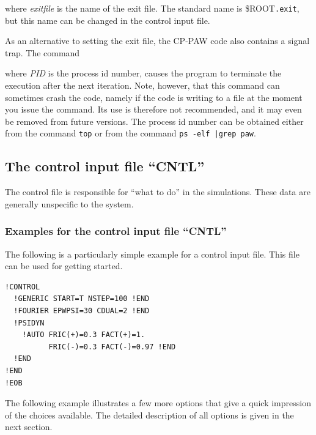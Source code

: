 \documentclass[final,12pt]{article}
\begin{document}
\bigskip{}\bigskip

\noindent where {\it exitfile} is the name of the exit file. 
The standard name is \$ROOT{\tt .exit}, but this name can be changed
in the control input file.

As an alternative to setting the exit file, the CP-PAW code also contains
a signal trap. The command

\bigskip{}\bigskip

\noindent where {\it PID} is the process id number, causes the program
to terminate the execution after the next iteration. Note, however,
that this command can sometimes crash the code, namely if the code is
writing to a file at the moment you issue the command.  Its use is
therefore not recommended, and it may even be removed from future
versions. The process id number can be obtained either from the
command \verb|top| or from the command \verb+ps -elf |grep paw+.

%
\subsection{The control input file ``CNTL''}

The control file is responsible for ``what to do'' in the
simulations. These data are generally unspecific to the system.

\subsubsection{Examples for the control input file ``CNTL''}
The following is a particularly simple example for a control input
file. This file can be used for getting started.

\begin{verbatim}
!CONTROL
  !GENERIC START=T NSTEP=100 !END   
  !FOURIER EPWPSI=30 CDUAL=2 !END
  !PSIDYN  
    !AUTO FRIC(+)=0.3 FACT(+)=1. 
          FRIC(-)=0.3 FACT(-)=0.97 !END
  !END
!END         
!EOB
\end{verbatim}

The following example illustrates a few more options that give a quick
impression of the choices available. The detailed description of all
options is given in the next section.
\end{document}
